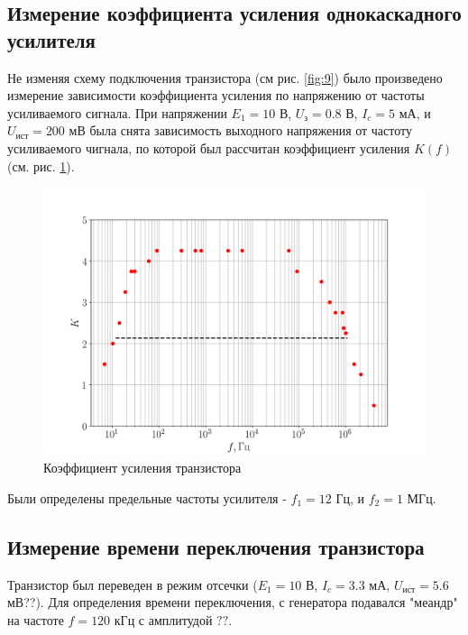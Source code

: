 \subsection{Измерение коэффициента усиления однокаскадного усилителя}
Не изменяя схему подключения транзистора (см рис. \ref{fig:9}) было произведено измерение зависимости коэффициента
усиления по напряжению от частоты усиливаемого сигнала.
При напряжении $E_1 = 10$ В, $U_{\text{з}} = 0.8$ В, $I_c = 5$ мА, и $U_{\text{ист}} = 200$ мВ была снята зависимость
выходного напряжения от частоту усиливаемого чигнала, по которой был рассчитан коэффициент усиления $K(f)$ (см. рис.
\ref{fig:11}).

\begin{figure}[h!]
	\centering
	\includegraphics[width=0.8\linewidth]{fig/task4.png}
	\caption{Коэффициент усиления транзистора}
	\label{fig:11}
\end{figure}
Были определены предельные частоты усилителя - $f_1 = 12$ Гц, и $f_2 = 1$ МГц.

\subsection{Измерение времени переключения транзистора}
Транзистор был переведен в режим отсечки ($E_1 = 10$ В, $I_c = 3.3$ мА, $U_{\text{ист}} = 5.6$ мВ??). Для
определения времени переключения, с генератора подавался "меандр" на частоте $f = 120$ кГц с амплитудой $??$.

